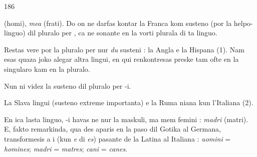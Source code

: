 \begin{VUpage}[190]{186}
\VUasterismo{48.68mm}

\VUcontinue
(homi), \textit{mea} (frati). Do on ne darfas kontar la Franca kom\nl
susteno (por la helpo-linguo) dil pluralo per , ca  ne\nl
sonante en la vorti plurala di ta linguo.

Restas vere por la pluralo per  nur \textit{du} susteni : la Angla\nl
e la Hispana (1). Nam esas quaza joko alegar altra lingui,\nl
en qui  renkontresas preske tam ofte en la singularo kam\nl
en la pluralo.

\VUsaut{6.99mm}
Nun ni videz la susteno dil pluralo per -i.

La Slava lingui (susteno extreme importanta) e la Ruma\cc
niana kun l'Italiana (2).

En ica lasta linguo, -i havas ne nur la maskuli, ma mem\nl
femini : \textit{madri} (matri). E, fakto remarkinda,  qua des\cc
aparis en la paso dil Gotika al Germana, transformesis\nl
a i (kun \textit{e} di \textit{es}) pasante de la Latina al Italiana : \textit{uomini}\nl
= \textit{homines}; \textit{madri} = \textit{matres}; \textit{cani} = \textit{canes}.


\end{VUpage}
